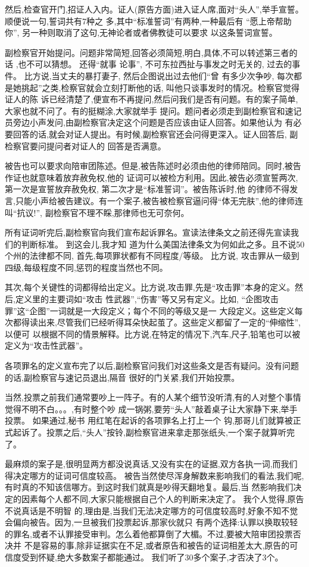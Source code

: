 ﻿\documentclass[10pt]{article}
\begin{document}
{然后,检查官开门,招证人入内。证人(原告方面)进入证人席,面对``头人'',举手宣誓。顺便说一句,誓词共有7种之
多,其中``标准誓词''有两种,一种最后有 ``愿上帝帮助你'', 另一种则取消了这句,无神论者或者佛教徒可以要求
以这条誓词宣誓。

副检察官开始提问。问题非常简短,回答必须简短,明白,具体,不可以转述第三者的话 ,也不可以猜想。 还得``就事
论事'', 不可东拉西扯与事发之时无关的, 过去的事件。 比方说,当丈夫的暴打妻子, 然后企图说出过去他们``曾
有多少次争吵, 每次都是她挑起''之类,检察官就会立刻打断他的话, 叫他只谈事发时的情况。检察官觉得证人的陈
诉已经清楚了,便宣布不再提问,然后问我们是否有问题。有的案子简单, 大家也就不问了。有的挺糊涂,大家就举手
提问。题问者必须走到副检察官和速记员旁边小声发问,由副检察官决定这个问题是否应该由证人回答。如果他认为
有必要回答的话,就会对证人提出。有时候,副检察官还会问得更深入。证人回答后, 副检察官要问提问者对证人的
回答是否满意。

被告也可以要求向陪审团陈述。但是,被告陈述时必须由他的律师陪同。同时,被告作证也就意味着放弃赦免权,他的
证词可以被检方利用。因此,被告必须宣誓两次,第一次是宣誓放弃赦免权, 第二次才是``标准誓词''。被告陈诉时,他
的律师不得发言,只能小声给被告建议。有一个案子,被告被检察官逼问得``体无完肤'',他的律师连叫``抗议!'',
副检察官不理不睬,那律师也无可奈何。

所有证词听完后,副检察官向我们宣布起诉罪名。宣读法律条文之前还得先宣读我们的判断标准。 到这会儿,我才知
道为什么美国法律条文为何如此之多。且不说50个州的法律都不同, 首先,每项罪状都有不同程度/等级。 比方说,
攻击罪从一级到四级,每级程度不同,惩罚的程度当然也不同。

其次,每个关键性的词都得给出定义。比方说,攻击罪,先是``攻击罪''本身的定义。然后,定义里的主要词如``攻击
性武器'',``伤害''等又另有定义。比如, ``企图攻击罪''这``企图''一词就是一大段定义；每个不同的等级又是一
大段定义。这些定义每次都得读出来,尽管我们已经听得耳朵快起茧了。这些定义都留了一定的``伸缩性'',以便可
以根据不同的情景解释。比方说,在特定的情况下,汽车,尺子,铅笔也可以被定义为``攻击性武器''。

各项罪名的定义宣布完了以后,副检察官问我们对这些条文是否有疑问。没有问题的话,副检察官与速记员退出,隔音
很好的门关紧,我们开始投票。

当然,投票之前我们通常要吵上一阵子。有的人某个细节没听清,有的人对整个事情觉得不明不白。。。,有时整个吵
成一锅粥,要劳``头人''敲着桌子让大家静下来,举手投票。 如果通过,秘书 用红笔在起诉的各项罪名上打上一个
钩,那哥儿们就算被正式起诉了。投票之后,``头人''按铃,副检察官进来拿走那张纸头,一个案子就算听完了。

最麻烦的案子是,很明显两方都没说真话,又没有实在的证据,双方各执一词,而我们得决定哪方的证词可信度较高。
被告当然使尽浑身解数来影响我们的看法,我们呢,有时真的不知该信哪方。到这时我们就真是吵得天翻地复。最后,当
然影响我们决定的因素每个人都不同,大家只能根据自己个人的判断来决定了。 我个人觉得,原告不说真话是不明智
的,理由是,当我们无法决定哪方的可信度较高时,好象不知不觉会偏向被告。因为,一旦被我们投票起诉,那家伙就只
有两个选择:认罪以换取较轻的罪名,或者不认罪接受审判。怎么着他都算倒了大楣。不过,要被大陪审团投票否决并
不是容易的事,除非证据实在不足,或者原告和被告的证词相差太大,原告的可信度受到怀疑,绝大多数案子都能通过。
我们听了30多个案子,才否决了3个。

}
\end{document}
